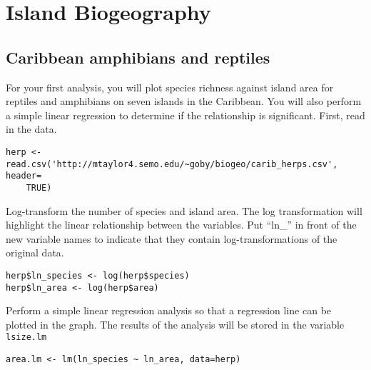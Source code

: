 \documentclass[11pt]{article}
\begin{document}
\thispagestyle{first_page}


\section*{Island Biogeography}


\subsection*{Caribbean amphibians and reptiles}

For your first analysis, you will plot species richness against island area for reptiles and amphibians on seven islands in the Caribbean. You will also perform a simple linear regression to determine if the relationship is significant. First, read in the data.

{\small 
\begin{verbatim}
herp <- read.csv('http://mtaylor4.semo.edu/~goby/biogeo/carib_herps.csv', header=
    TRUE)
\end{verbatim}}

Log-transform the number of species and island area. The log transformation will highlight the linear relationship between the variables. Put ``ln\_'' in front of the new variable names to indicate that they contain log-transformations of the original data.

\begin{verbatim}
herp$ln_species <- log(herp$species)
herp$ln_area <- log(herp$area)

\end{verbatim}

Perform a simple linear regression analysis so that a regression line can be plotted in the graph. The results of the analysis will be stored in the variable \texttt{lsize.lm}

\begin{verbatim}
area.lm <- lm(ln_species ~ ln_area, data=herp)

\end{verbatim}
\end{document}
